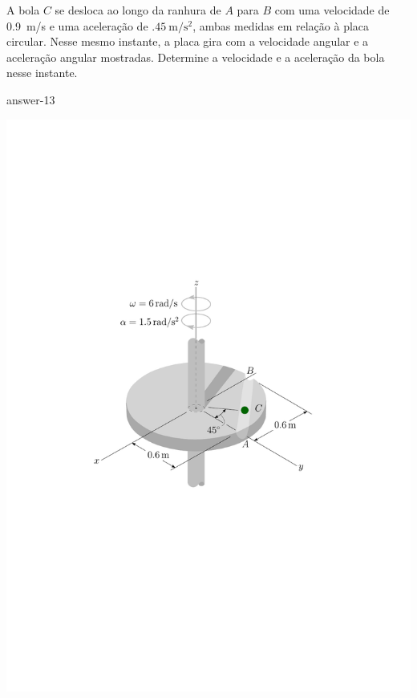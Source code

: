 \item A bola $C$ se desloca ao longo da ranhura de $A$ para $B$ com uma velocidade de \SI{.9}{\meter/\second} e uma aceleração de $\SI{.45}{\meter/\second^{2}}$, ambas medidas em relação à placa circular. Nesse mesmo instante, a placa gira com a velocidade angular e a aceleração angular mostradas. Determine a velocidade e a aceleração da bola nesse instante. 

{answer-13}

\vspace{-2cm}
\begin{flushleft}
	\includegraphics[scale=1]{images/draw_15}
\end{flushleft}